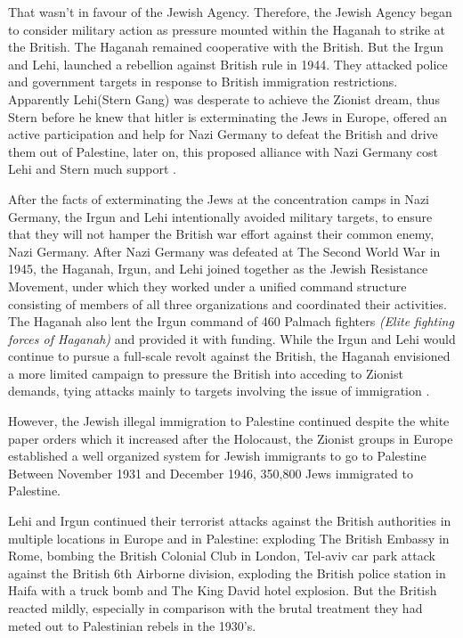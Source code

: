 That wasn't in favour of the Jewish Agency. Therefore, the Jewish Agency began to consider military action as pressure mounted within the Haganah to strike at the British. The Haganah remained cooperative with the British. But the Irgun and Lehi, launched a rebellion against British rule in 1944. They attacked police and government targets in response to British immigration restrictions. 
Apparently Lehi(Stern Gang) was desperate to achieve the Zionist dream, thus Stern before he knew that hitler is exterminating the Jews in Europe, offered an active participation and help for Nazi Germany to defeat the British and drive them out of Palestine, later on, this proposed alliance with Nazi Germany cost Lehi and Stern much support \citep{Shlaim2014}\citep{Heller1995}\citep{Grob-Fitzgibbon2011}. 

After the facts of exterminating the Jews at the concentration camps in Nazi Germany, the Irgun and Lehi intentionally avoided military targets, to ensure that they will not hamper the British war effort against their common enemy, Nazi Germany. After Nazi Germany was defeated at The Second World War in 1945, the Haganah, Irgun, and Lehi joined together as the Jewish Resistance Movement, under which they worked under a unified command structure consisting of members of all three organizations and coordinated their activities. The Haganah also lent the Irgun command of 460 Palmach fighters \textit{(Elite fighting forces of Haganah)} and provided it with funding. While the Irgun and Lehi would continue to pursue a full-scale revolt against the British, the Haganah envisioned a more limited campaign to pressure the British into acceding to Zionist demands, tying attacks mainly to targets involving the issue of immigration \citep{Bell1976}\citep{Shlaim2014}.

However, the Jewish illegal immigration to Palestine continued despite the white paper orders which it increased after the Holocaust, the Zionist groups in Europe established a well organized system for Jewish immigrants to go to Palestine Between November 1931 and December 1946, 350,800 Jews immigrated to Palestine\citep{Grob-Fitzgibbon2011}\citep{Heller1995}.   

Lehi and Irgun continued their terrorist attacks against the British authorities in multiple locations in Europe and in Palestine: exploding The British Embassy in Rome, bombing the British Colonial Club in London, Tel-aviv car park attack against the British 6th Airborne division, exploding the British police station in Haifa with a truck bomb and The King David hotel explosion\citep{Bell1976}. But the British reacted mildly, especially in comparison with the brutal treatment they had meted out to Palestinian rebels in the 1930's\citep{Pappe2006}.
 
